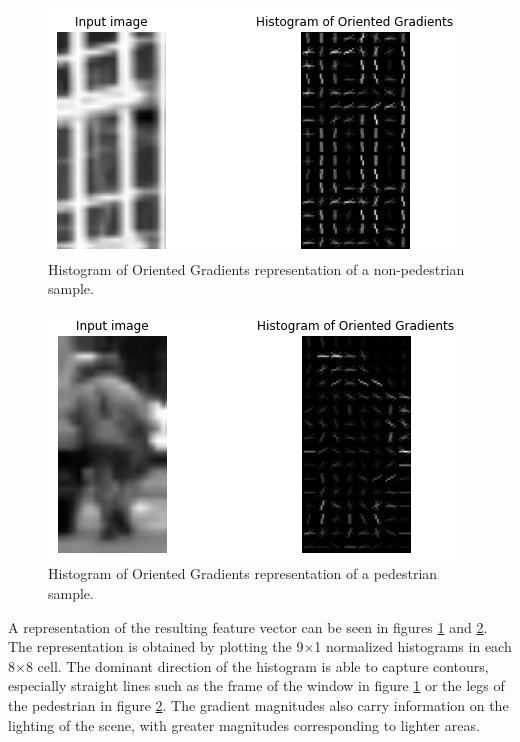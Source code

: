 \documentclass[journal,twocolumn]{IEEEtran}
\begin{document}
\begin{figure}[h]
\centering
\includegraphics[keepaspectratio,width=0.9\columnwidth]{3}
\caption[HOG representation of a non-pedestrian sample]{Histogram of Oriented Gradients representation of a non-pedestrian sample.}
\label{fig:3}
\end{figure}
\begin{figure}[h]
\centering
\includegraphics[keepaspectratio,width=0.9\columnwidth]{4}
\caption[HOG representation of a pedestrian sample]{Histogram of Oriented Gradients representation of a pedestrian sample.}
\label{fig:4}
\end{figure}

A representation of the resulting feature vector can be seen in figures \ref{fig:3} and \ref{fig:4}. The representation is obtained by plotting the 9$\times$1 normalized histograms in each 8$\times$8 cell. The dominant direction of the histogram is able to capture contours, especially straight lines such as the frame of the window in figure \ref{fig:3} or the legs of the pedestrian in figure \ref{fig:4}. The gradient magnitudes also carry information on the lighting of the scene, with greater magnitudes corresponding to lighter areas.
\end{document}
